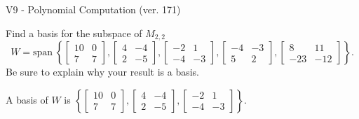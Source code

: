 \begin{exercise}
  \begin{exerciseTitle}V9 - Polynomial Computation (ver. 171)\end{exerciseTitle}
  \begin{exerciseStatement}
    Find a basis for the subspace of \(M_{2,2}\) 
\[W=\mathrm{span}\ \left\{\left[\begin{array}{cc}
10 & 0 \\
7 & 7
\end{array}\right] , \left[\begin{array}{cc}
4 & -4 \\
2 & -5
\end{array}\right] , \left[\begin{array}{cc}
-2 & 1 \\
-4 & -3
\end{array}\right] , \left[\begin{array}{cc}
-4 & -3 \\
5 & 2
\end{array}\right] , \left[\begin{array}{cc}
8 & 11 \\
-23 & -12
\end{array}\right]\right\}.\]
 Be sure to explain why your result is a basis.


  \end{exerciseStatement}
  \begin{exerciseAnswer}
   A basis of \(W\) is  \(\left\{\left[\begin{array}{cc}
10 & 0 \\
7 & 7
\end{array}\right] , \left[\begin{array}{cc}
4 & -4 \\
2 & -5
\end{array}\right] , \left[\begin{array}{cc}
-2 & 1 \\
-4 & -3
\end{array}\right]\right\}\).
  


  \end{exerciseAnswer}
\end{exercise}